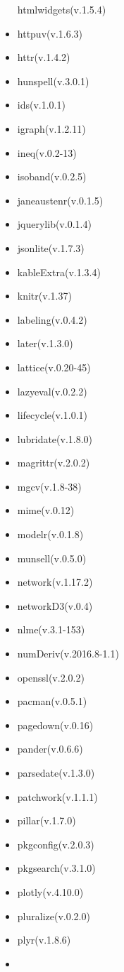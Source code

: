 \documentclass[
]{article}
\begin{document}
\begin{itemize}
  htmlwidgets(v.1.5.4)
\item
  httpuv(v.1.6.3)
\item
  httr(v.1.4.2)
\item
  hunspell(v.3.0.1)
\item
  ids(v.1.0.1)
\item
  igraph(v.1.2.11)
\item
  ineq(v.0.2-13)
\item
  isoband(v.0.2.5)
\item
  janeaustenr(v.0.1.5)
\item
  jquerylib(v.0.1.4)
\item
  jsonlite(v.1.7.3)
\item
  kableExtra(v.1.3.4)
\item
  knitr(v.1.37)
\item
  labeling(v.0.4.2)
\item
  later(v.1.3.0)
\item
  lattice(v.0.20-45)
\item
  lazyeval(v.0.2.2)
\item
  lifecycle(v.1.0.1)
\item
  lubridate(v.1.8.0)
\item
  magrittr(v.2.0.2)
\item
  mgcv(v.1.8-38)
\item
  mime(v.0.12)
\item
  modelr(v.0.1.8)
\item
  munsell(v.0.5.0)
\item
  network(v.1.17.2)
\item
  networkD3(v.0.4)
\item
  nlme(v.3.1-153)
\item
  numDeriv(v.2016.8-1.1)
\item
  openssl(v.2.0.2)
\item
  pacman(v.0.5.1)
\item
  pagedown(v.0.16)
\item
  pander(v.0.6.6)
\item
  parsedate(v.1.3.0)
\item
  patchwork(v.1.1.1)
\item
  pillar(v.1.7.0)
\item
  pkgconfig(v.2.0.3)
\item
  pkgsearch(v.3.1.0)
\item
  plotly(v.4.10.0)
\item
  pluralize(v.0.2.0)
\item
  plyr(v.1.8.6)
\item

\end{itemize}
\end{document}
